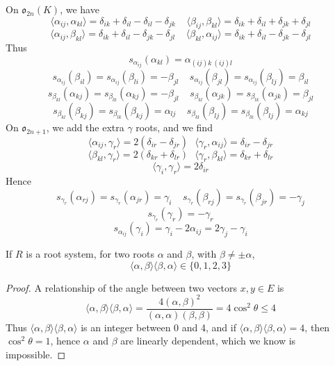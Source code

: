 \begin{example}
    On $\mathfrak{o}_{2n}(K)$, we have
    \[ \langle \alpha_{ij}, \alpha_{kl} \rangle = \delta_{ik} + \delta_{il} - \delta_{il} - \delta_{jk}\ \ \ \ \ \langle \beta_{ij}, \beta_{kl} \rangle = \delta_{ik} + \delta_{il} + \delta_{jk} + \delta_{jl} \]
    \[ \langle \alpha_{ij}, \beta_{kl} \rangle = \delta_{ik} + \delta_{il} - \delta_{jk} - \delta_{jl}\ \ \ \ \ \langle \beta_{kl}, \alpha_{ij} \rangle = \delta_{ik} + \delta_{il} - \delta_{jk} - \delta_{jl} \]
    Thus
    \[s_{\alpha_{ij}}(\alpha_{kl}) = \alpha_{(ij)k\ (ij)l} \]
    \[ s_{\alpha_{ij}}(\beta_{il}) = s_{\alpha_{ij}}(\beta_{li}) = - \beta_{jl}\ \ \ \ \ s_{\alpha_{ij}}(\beta_{jl}) = s_{\alpha_{ij}}(\beta_{lj}) = \beta_{il} \]
    \[ s_{\beta_{kl}}(\alpha_{kj}) = s_{\beta_{lk}}(\alpha_{kj}) = - \beta_{jl}\ \ \ \ \ s_{\beta_{kl}}(\alpha_{jk}) = s_{\beta_{lk}}(\alpha_{jk}) = \beta_{jl} \]
    \[ s_{\beta_{kl}}(\beta_{kj}) = s_{\beta_{lk}}(\beta_{kj}) = \alpha_{lj}\ \ \ \ \ s_{\beta_{kl}}(\beta_{lj}) = s_{\beta_{lk}}(\beta_{lj}) = \alpha_{kj} \]
    On $\mathfrak{o}_{2n+1}$, we add the extra $\gamma$ roots, and we find
    \[ \langle \alpha_{ij}, \gamma_r \rangle = 2(\delta_{ir} - \delta_{jr})\ \ \ \langle \gamma_r, \alpha_{ij} \rangle = \delta_{ir} - \delta_{jr} \]
    \[ \langle \beta_{kl}, \gamma_r \rangle = 2(\delta_{kr} + \delta_{lr})\ \ \ \langle \gamma_r, \beta_{kl} \rangle = \delta_{kr} + \delta_{lr} \]
    \[ \langle \gamma_i, \gamma_r \rangle = 2\delta_{ir} \]
    Hence
    \[ s_{\gamma_r}(\alpha_{rj}) = s_{\gamma_r}(\alpha_{jr}) = \gamma_i\ \ \ \ \ s_{\gamma_r}(\beta_{rj}) = s_{\gamma_r}(\beta_{jr}) = - \gamma_j \]
    \[ s_{\gamma_r}(\gamma_r) = -\gamma_r \]
    \[ s_{\alpha_{ij}}(\gamma_i) = \gamma_i - 2\alpha_{ij} = 2\gamma_j - \gamma_i \]
\end{example}

\begin{lemma}
    If $R$ is a root system, for two roots $\alpha$ and $\beta$, with $\beta \neq \pm \alpha$,
    \[ \langle \alpha, \beta \rangle \langle \beta, \alpha \rangle \in \{ 0, 1, 2, 3 \} \]
\end{lemma}
\begin{proof}
    A relationship of the angle between two vectors $x,y \in E$ is
    \[ \langle \alpha, \beta \rangle \langle \beta, \alpha \rangle = \frac{4 (\alpha, \beta)^2}{(\alpha, \alpha)(\beta, \beta)} = 4\cos^2 \theta \leq 4 \]
    Thus $\langle \alpha, \beta \rangle \langle \beta, \alpha \rangle$ is an integer between 0 and 4, and if $\langle \alpha, \beta \rangle \langle \beta, \alpha \rangle = 4$, then $\cos^2 \theta = 1$, hence $\alpha$ and $\beta$ are linearly dependent, which we know is impossible.
\end{proof}


